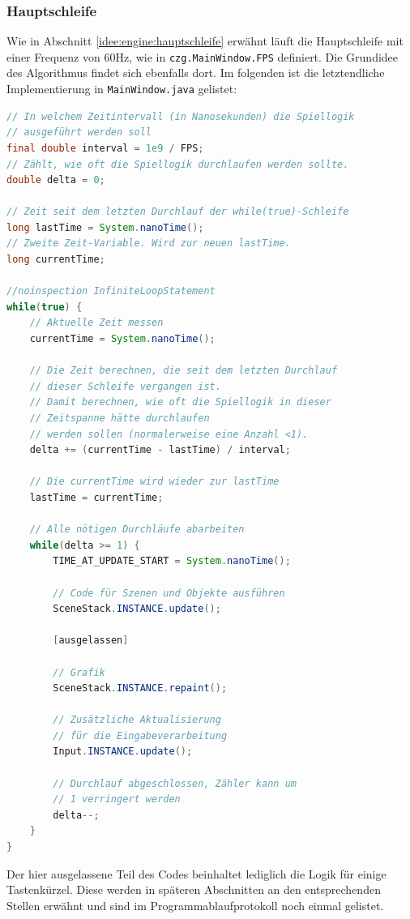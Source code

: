 \begin{sloppypar}
\subsubsection{Hauptschleife} \label{programm:engine:hauptschleife}

Wie in Abschnitt \ref{idee:engine:hauptschleife} erwähnt läuft die
Hauptschleife mit einer Frequenz von 60Hz, wie in \texttt{czg.MainWindow.FPS}
definiert. Die Grundidee des Algorithmus findet sich ebenfalls dort.
Im folgenden ist die letztendliche Implementierung in \texttt{MainWindow.java}
gelistet:

\begin{lstlisting}[caption=Hauptschleife, label=programm:engine:hauptschleife:code, captionpos=t, language=Java]
// In welchem Zeitintervall (in Nanosekunden) die Spiellogik
// ausgeführt werden soll
final double interval = 1e9 / FPS;
// Zählt, wie oft die Spiellogik durchlaufen werden sollte.
double delta = 0;

// Zeit seit dem letzten Durchlauf der while(true)-Schleife
long lastTime = System.nanoTime();
// Zweite Zeit-Variable. Wird zur neuen lastTime.
long currentTime;

//noinspection InfiniteLoopStatement
while(true) {
	// Aktuelle Zeit messen
	currentTime = System.nanoTime();
	
	// Die Zeit berechnen, die seit dem letzten Durchlauf
	// dieser Schleife vergangen ist.
	// Damit berechnen, wie oft die Spiellogik in dieser
	// Zeitspanne hätte durchlaufen
	// werden sollen (normalerweise eine Anzahl <1).
	delta += (currentTime - lastTime) / interval;
	
	// Die currentTime wird wieder zur lastTime
	lastTime = currentTime;
	
	// Alle nötigen Durchläufe abarbeiten
	while(delta >= 1) {
		TIME_AT_UPDATE_START = System.nanoTime();
		
		// Code für Szenen und Objekte ausführen
		SceneStack.INSTANCE.update();
		
		[ausgelassen]
		
		// Grafik
		SceneStack.INSTANCE.repaint();
		
		// Zusätzliche Aktualisierung
		// für die Eingabeverarbeitung
		Input.INSTANCE.update();
		
		// Durchlauf abgeschlossen, Zähler kann um
		// 1 verringert werden
		delta--;
	}
}
\end{lstlisting}

Der hier ausgelassene Teil des Codes beinhaltet lediglich
die Logik für einige Tastenkürzel. Diese werden in
späteren Abschnitten an den entsprechenden Stellen
erwähnt und sind im Programmablaufprotokoll noch einmal
gelistet.



\end{sloppypar}
